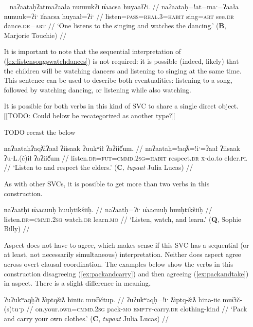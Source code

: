 \ex~ \label{ex:listensongswatchdances}
\begingl
\glpreamble naʔaataḥʔatmaʔaała nunuukʔi n̓aacsa huyaałʔi. //
\gla naʔaataḥ=!at=maˑ=ʔaała nunuuk=ʔiˑ n̓aacsa huyaał=ʔiˑ //
\glb listen=\textsc{pass}=\textsc{real.3}=\textsc{habit} sing=\textsc{art} see.\textsc{dr} dance.\textsc{dr}=\textsc{art} //
\glft `One listens to the singing and watches the dancing.' (\textbf{B}, Marjorie Touchie) //
\endgl
\xe

It is important to note that the sequential interpretation of (\ref{ex:listensongswatchdances}) is not required: it is possible (indeed, likely) that the children will be watching dancers and listening to singing at the same time. This sentence can be used to describe both eventualities: listening to a song, followed by watching dancing, or listening while also watching.

It is possible for both verbs in this kind of SVC to share a single direct object. [[TODO: Could below be recategorized as another type?]]

TODO recast the below

\ex \label{ex:listenrespect}
\begingl
\glpreamble naʔaataḥʔaqƛ̓iʔaał ʔiisaak ʔuukʷił ʔaʔiič̓um. //
\gla naʔaataḥ=!aqƛ=!iˑ=ʔaał ʔiisaak ʔu-L.(č)ił ʔaʔiič̓um //
\glb listen.\textsc{dr}=\textsc{fut}=\textsc{cmmd.2sg}=\textsc{habit} respect.\textsc{dr} \textsc{x}-do.to elder.\textsc{pl} //
\glft `Listen to and respect the elders.' (\textbf{C}, \textit{tupaat} Julia Lucas) //
\endgl
\xe


As with other SVCs, it is possible to get more than two verbs in this construction.

\ex \label{ex:listenwtachlearn}
\begingl
\glpreamble naʔaatḥi n̓aacuuḥ huuḥtikšiiḥ. //
\gla naʔaatḥ=ʔiˑ n̓aacuuḥ huuḥtikšiiḥ //
\glb listen.\textsc{dr}=\textsc{cmmd.2sg} watch.\textsc{dr} learn.\textsc{mo} //
\glft `Listen, watch, and learn.' (\textbf{Q}, Sophie Billy) //
\endgl
\xe

Aspect does not have to agree, which makes sense if this SVC has a sequential (or at least, not necessarily simultaneous) interpretation. Neither does aspect agree across overt clausal coordination. The examples below show the verbs in this construction disagreeing (\ref{ex:packandcarry}) and then agreeing (\ref{ex:packandtake}) in aspect. There is a slight difference in meaning.

\ex \label{ex:packandcarry}
\begingl
\glpreamble ʔuʔukʷaqḥʔi ƛ̓iptqšiƛ hiniic muč̓ičtup. //
\gla ʔuʔukʷaqḥ=!iˑ ƛ̓iptq-šiƛ hina-iic muč̓ič-(s)tuˑp //
\glb on.your.own=\textsc{cmmd.2sg} pack-\textsc{mo} \textsc{empty}-carry.\textsc{dr} clothing-kind //
\glft `Pack and carry your own clothes.' (\textbf{C}, \textit{tupaat} Julia Lucas) //
\endgl
\xe


